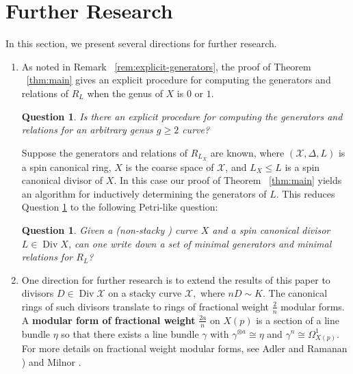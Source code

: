 \documentclass{amsart}
\theoremstyle{plain}
\newtheorem{question}[thm]{Question}
\theoremstyle{definition}
\theoremstyle{remark}
\numberwithin{equation}{section}
\DeclareMathOperator\di{Div}
\newcommand\sx{\mathscr X}
\newcommand{\halfcan}{L}
\begin{document}
\section{Further Research}
\label{sec:further-questions}

In this section, we present several directions for further research.

\begin{enumerate}
	\item As noted in Remark ~\ref{rem:explicit-generators}, the 
		proof of Theorem ~\ref{thm:main} 
		gives an 
		explicit procedure for computing the generators and relations of $R_
		\halfcan$ when the genus of $X$ is $0$ or $1$.
		\begin{question}
		\label{ques:algorithm}
			Is there an explicit procedure for computing the generators 
			and relations for an arbitrary genus $g \geq 2$ curve?
		\end{question}
		Suppose the generators and relations of $R_{\halfcan_X}$ are known, 
		where $(\sx, \Delta, L)$ is a spin canonical ring, $X$ is the 
		coarse space of $\sx$, and $L_X \leq L$ is a spin canonical divisor 
		of $X$. In this case our proof of Theorem ~\ref{thm:main} yields an 
		algorithm for inductively determining the generators of $\halfcan$. 
		This reduces Question \ref{ques:algorithm} to the 
		following Petri-like question:
		\begin{question}
		\label{ques:spin-canonical-petri}
			Given a {\rm(}non-stacky {\rm)} curve $X$ and a spin canonical 
			divisor $L \in \di X$, can one write down a set of minimal 
			generators and minimal relations for $R_\halfcan$?
		\end{question}
		
\item One direction for further research is to 
		extend the results of this paper to divisors $D \in \di \sx$ on a 
		stacky curve $\sx,$ where $nD \sim K.$ The canonical rings of such 
		divisors translate to rings of fractional weight $\frac{2}{n}$ modular 
		forms. A {\bf modular form 
		of fractional weight} $\frac{2a}{n}$ on $X(p)$ is a section of a 
		line bundle $\eta$ so that there exists a line bundle $\gamma$ with 
$\gamma^{\otimes a} \cong \eta$
 and 
 $\gamma^{n} \cong \Omega_{X(p)}^1$.
		For more details on fractional weight modular forms, see Adler and Ramanan \cite[p. 96]{adler:moduli}) and Milnor \cite
		[$\mathsection$ 6]{milnor:fractional-weight}.


\end{enumerate}
\end{document}
